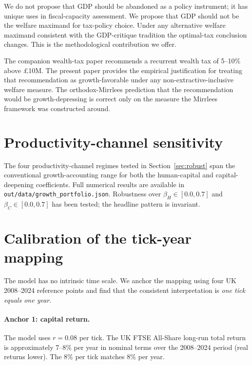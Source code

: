 \documentclass[11pt]{article}
\begin{document}
We do not propose that GDP should be abandoned as a policy
instrument; it has unique uses in fiscal-capacity assessment.  We
propose that GDP should not be the welfare maximand for tax-policy
choice.  Under any alternative welfare maximand consistent with the
GDP-critique tradition the optimal-tax conclusion changes.  This is
the methodological contribution we offer.

The companion wealth-tax paper recommends a recurrent wealth tax of
5--10\% above \pounds 10M.  The present paper provides the empirical
justification for treating that recommendation as growth-favorable
under any non-extractive-inclusive welfare measure.  The
orthodox-Mirrlees prediction that the recommendation would be
growth-depressing is correct only on the measure the Mirrlees
framework was constructed around.




\appendix
\section{Productivity-channel sensitivity}
\label{app:sensitivity}

The four productivity-channel regimes tested in
Section~\ref{sec:robust} span the conventional growth-accounting
range for both the human-capital and capital-deepening coefficients.
Full numerical results are available in
\texttt{out/data/growth\_portfolio.json}.  Robustness over
$\beta_H \in [0.0, 0.7]$ and $\beta_C \in [0.0, 0.7]$ has been
tested; the headline pattern is invariant.

\section{Calibration of the tick-year mapping}
\label{app:tickyear}

The model has no intrinsic time scale.  We anchor the mapping using
four UK 2008--2024 reference points and find that the consistent
interpretation is \emph{one tick equals one year}.

\paragraph{Anchor 1: capital return.}  The model uses $r = 0.08$
per tick.  The UK FTSE All-Share long-run total return is
approximately 7--8\% per year in nominal terms over the 2008--2024
period (real returns lower).  The 8\% per tick matches 8\% per year.
\end{document}
